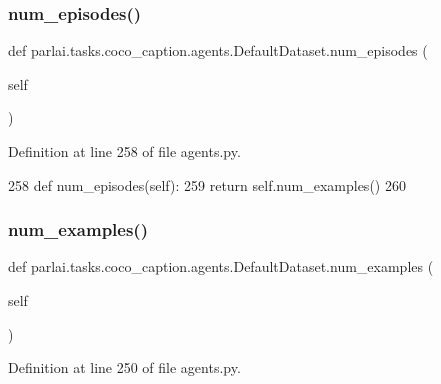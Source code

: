 \subsubsection{\texorpdfstring{num\+\_\+episodes()}{num\_episodes()}}
{\footnotesize\ttfamily def parlai.\+tasks.\+coco\+\_\+caption.\+agents.\+Default\+Dataset.\+num\+\_\+episodes (\begin{DoxyParamCaption}\item[{}]{self }\end{DoxyParamCaption})}



Definition at line 258 of file agents.\+py.


\begin{DoxyCode}
258     \textcolor{keyword}{def }num\_episodes(self):
259         \textcolor{keywordflow}{return} self.num\_examples()
260 
\end{DoxyCode}
\mbox{\label{classparlai_1_1tasks_1_1coco__caption_1_1agents_1_1DefaultDataset_aec6fa2ed48a0ef6af6d2088fc2506623}} 
\subsubsection{\texorpdfstring{num\+\_\+examples()}{num\_examples()}}
{\footnotesize\ttfamily def parlai.\+tasks.\+coco\+\_\+caption.\+agents.\+Default\+Dataset.\+num\+\_\+examples (\begin{DoxyParamCaption}\item[{}]{self }\end{DoxyParamCaption})}



Definition at line 250 of file agents.\+py.


